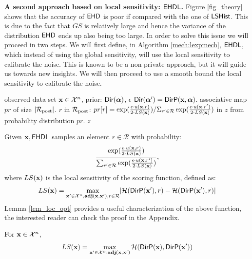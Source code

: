 \documentclass{article}
\begin{document}
\noindent \textbf{A second approach based on local sensitivity: $\lexpmech$.} Figure \ref{fig_theory} shows that  the accuracy of
$\mathsf{EHD}$ is poor if compared with the one of $\mathsf{LSHist}$. This is due to the fact that
$GS$ is relatively large and hence the variance of the distribution $\mathsf{EHD}$ ends up also being too large. In order to solve this issue we
will proceed in two steps. We will first define, in Algorithm   \ref{mech:lexpmech}, $\lexpmech$, which instead of using the global sensitivity, will use the local sensitivity to calibrate
the noise. This is known to be a non private approach, but it will guide us towards new insights.
We will then proceed to use a smooth bound the local sensitivity to
calibrate the noise.

  \begin{algorithm}
  \caption{$\lexpmech$}
  \label{mech:lexpmech}
  \begin{algorithmic}
  \INPUT observed data set $\textbf{x} \in \mathcal{X}^n$, prior: $\mathsf{Dir}(\boldsymbol{\alpha})$, $\epsilon$
  \STATE {} $\mathsf{Dir}(\boldsymbol{\alpha}')= \mathsf{DirP}(\textbf{x},\boldsymbol{\alpha})$.   
  \STATE {} associative map $pr$ of size $|\mathcal{R}_{\textup{post}}|$.
  \STATE {} $r$ in $\mathcal{R}_{\textup{post}}$:
  \STATE \quad \quad $pr[r] = 
  {\exp(\frac{\epsilon\cdot u(\textbf{x}, {r})}{2\cdot LS(\textbf{x})})}
/ {\Sigma_{r' \in \mathcal{R}}\exp(\frac{\epsilon\cdot u(\textbf{x}, r')}{2\cdot LS(\textbf{x})})}$
\STATE {} in $z$ from probability distribution $pr$.
 $z$
  \end{algorithmic}
  \end{algorithm}


Given $\textbf{x}, \mathsf{EHDL}$ samples an element $r \in \mathcal{R}$ with probability:
\[
\frac
  {\exp(\frac{\epsilon \cdot u(\textbf{x}, {r})}{2\cdot LS(\textbf{x})})}
{\sum_{r' \in \mathcal{R}}\exp(\frac{\epsilon\cdot u(\textbf{x}, {r'})}{2\cdot LS(\textbf{x})})},
\]
where $LS(\textbf{x})$ is the local sensitivity of the scoring function, defined as:
\begin{equation}\label{eq:local_sensitivity_scoring}
LS(\textbf{x})=\max_{\textbf{x}'\in\mathcal{X}^n,\textbf{adj}(\textbf{x},\textbf{x}'), r\in \mathcal{R}}\lvert \mathcal{H}(\mathsf{DirP}(\textbf{x}'), r) - \mathcal{H}(\mathsf{DirP}(\textbf{x}'), r)\rvert 
\end{equation}
Lemma \ref{lem_loc_opt}  provides a useful characterization of the above function, the interested reader can check the proof in the Appendix.
\begin{lem}
\label{lem_loc_opt}
For $\textbf{x}\in\mathcal{X}^n$, 
\[LS(\textbf{x}) = \max\limits_{\textbf{x}' \in \mathcal{X}^n:\textbf{adj}(\textbf{x},\textbf{x}')} \mathcal{H}(\mathsf{DirP}(\textbf{x}), \mathsf{DirP}(\textbf{x}'))\]
\end{lem}
\end{document}
